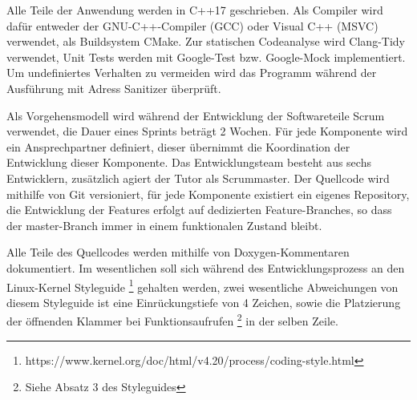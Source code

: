 Alle Teile der Anwendung werden in C++17 geschrieben. Als Compiler wird dafür entweder der GNU-C++-Compiler (GCC) oder Visual C++ (MSVC) verwendet, als Buildsystem CMake.
Zur statischen Codeanalyse wird Clang-Tidy verwendet, Unit Tests werden mit Google-Test bzw. Google-Mock implementiert.
Um undefiniertes Verhalten zu vermeiden wird das Programm während der Ausführung mit Adress Sanitizer überprüft.

Als Vorgehensmodell wird während der Entwicklung der Softwareteile Scrum verwendet, die Dauer eines Sprints beträgt 2 Wochen. Für jede Komponente wird ein Ansprechpartner definiert, dieser übernimmt die Koordination der Entwicklung dieser Komponente.
Das Entwicklungsteam besteht aus sechs Entwicklern, zusätzlich agiert der Tutor als Scrummaster. Der Quellcode wird mithilfe von Git versioniert, für jede Komponente existiert ein eigenes Repository, die Entwicklung der Features erfolgt auf dedizierten Feature-Branches, so dass der master-Branch immer in einem funktionalen Zustand bleibt.

Alle Teile des Quellcodes werden mithilfe von Doxygen-Kommentaren dokumentiert. Im wesentlichen soll sich während des Entwicklungsprozess an den Linux-Kernel Styleguide \footnote{https://www.kernel.org/doc/html/v4.20/process/coding-style.html} gehalten werden, zwei wesentliche Abweichungen von diesem Styleguide ist eine Einrückungstiefe von 4 Zeichen, sowie die Platzierung der öffnenden Klammer bei Funktionsaufrufen \footnote{Siehe Absatz 3 des Styleguides} in der selben Zeile.

